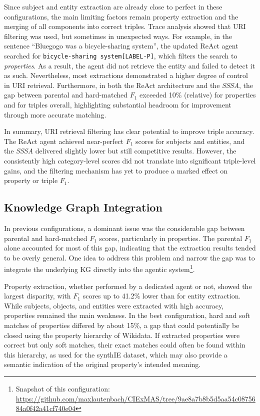 \documentclass[a4paper,oneside,bibliography=totoc]{scrbook}
\begin{document}
Since subject and entity extraction are already close to perfect in these configurations, the main limiting factors remain property extraction and the merging of all components into correct triples. Trace analysis showed that \ac{URI} filtering was used, but sometimes in unexpected ways. For example, in the sentence \enquote{Bluegogo was a bicycle-sharing system}, the updated ReAct agent searched for \texttt{bicycle-sharing system[LABEL-P]}, which filters the search to \textit{properties}. As a result, the agent did not retrieve the entity and failed to detect it as such. Nevertheless, most extractions demonstrated a higher degree of control in \ac{URI} retrieval. Furthermore, in both the ReAct architecture and the \textit{\ac{SSSA}}, the gap between parental and hard-matched $F_{1}$ exceeded 10\% (relative) for properties and for triples overall, highlighting substantial headroom for improvement through more accurate matching.

In summary, \ac{URI} retrieval filtering has clear potential to improve triple accuracy. The ReAct agent achieved near-perfect $F_{1}$ scores for subjects and entities, and the \textit{\ac{SSSA}} delivered slightly lower but still competitive results. However, the consistently high category-level scores did not translate into significant triple-level gains, and the filtering mechanism has yet to produce a marked effect on property or triple $F_{1}$.

\subsection{Knowledge Graph Integration}
\label{subsec:knowledge_graph_integration}

In previous configurations, a dominant issue was the considerable gap between parental and hard-matched $F_{1}$ scores, particularly in properties. The parental $F_{1}$ alone accounted for most of this gap, indicating that the extraction results tended to be overly general. One idea to address this problem and narrow the gap was to integrate the underlying \ac{KG} directly into the agentic system\footnote{Snapshot of this configuration: \url{https://github.com/maxlautenbach/CIExMAS/tree/9ae8a7b8b5d5aa54c0875684a0f42a41cf740e04}}.

Property extraction, whether performed by a dedicated agent or not, showed the largest disparity, with $F_{1}$ scores up to 41.2\% lower than for entity extraction. While subjects, objects, and entities were extracted with high accuracy, properties remained the main weakness. In the best configuration, hard and soft matches of properties differed by about 15\%, a gap that could potentially be closed using the property hierarchy of Wikidata. If extracted properties were correct but only soft matches, their exact matches could often be found within this hierarchy, as used for the synthIE dataset, which may also provide a semantic indication of the original property's intended meaning.
\end{document}
